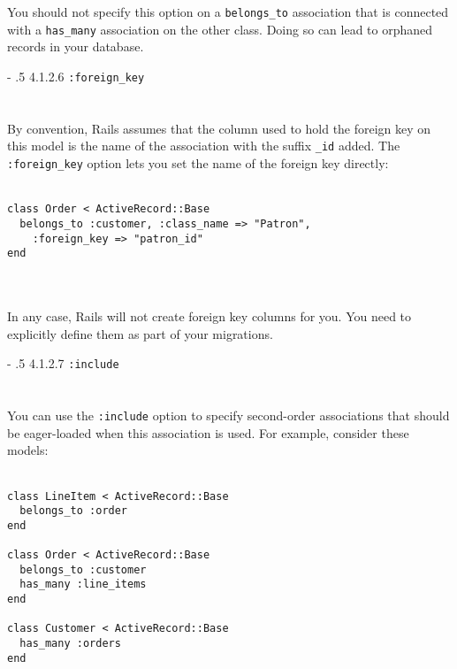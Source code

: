 \documentclass[10pt]{book}
\makeatletter
\renewcommand\paragraph{%
   \@startsection{paragraph}{4}{0mm}%
      {-\baselineskip}%
      {.5\baselineskip}%
      {\normalfont\scriptsize\bfseries}}
\makeatother
\begin{document}
You should not specify this option on a \texttt{belongs\_to} association that is connected with a \texttt{has\_many} association on the other class. Doing so can lead to orphaned records in your database.

\paragraph{4.1.2.6 \texttt{:foreign\_key}}\\ \\\\

By convention, Rails assumes that the column used to hold the foreign  key on this model is the name of the association with the suffix \texttt{\_id} added. The \texttt{:foreign\_key} option lets you set the name of the foreign key directly:
\\ \\
\begin{minipage}{\textwidth}{\scriptsize
\begin{verbatim}
class Order < ActiveRecord::Base
  belongs_to :customer, :class_name => "Patron",
    :foreign_key => "patron_id"
end
\end{verbatim}}
\end{minipage}
\\ \\

In any case, Rails will not create foreign key columns for you. You need to explicitly define them as part of your migrations.

\paragraph{4.1.2.7 \texttt{:include}}\\ \\\\

You can use the \texttt{:include} option to specify second-order  associations that should be eager-loaded when this association is used.  For example, consider these models:
\\ \\
\begin{minipage}{\textwidth}{\scriptsize
\begin{verbatim}
class LineItem < ActiveRecord::Base
  belongs_to :order
end
 
class Order < ActiveRecord::Base
  belongs_to :customer
  has_many :line_items
end
 
class Customer < ActiveRecord::Base
  has_many :orders
end
\end{verbatim}}
\end{minipage}
\\ \\
\end{document}
